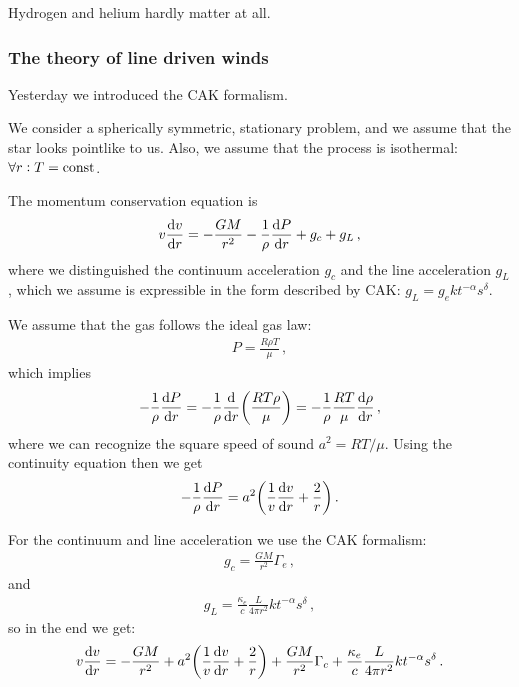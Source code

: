 \documentclass[main.tex]{subfiles}
\begin{document}
Hydrogen and helium hardly matter at all.
 
\subsubsection{The theory of line driven winds}

Yesterday we introduced the CAK formalism. 

We consider a spherically symmetric, stationary problem, and we assume that the star looks pointlike to us. 
Also, we assume that the process is isothermal: \(\forall r: T = \text{const} \). 

The momentum conservation equation is 
%
\begin{align}
v \dv{v}{r} = - \frac{GM}{r^2} - \frac{1}{\rho} \dv{P}{r} 
+ g_{c} + g_{L} 
\,,
\end{align}
%
where we distinguished the continuum acceleration \(g_{c}\) and the line acceleration \(g_{L}\), which we assume is expressible in the form described by CAK: \(g_L = g_e k t^{-\alpha } s^{ \delta } \). 

We assume that the gas follows the ideal gas law: 
%
\begin{align}
  P = \frac{R \rho T}{\mu }
\,,
\end{align}
%
which implies 
%
\begin{align}
  - \frac{1}{\rho } \dv{P}{r} = - \frac{1}{\rho }
  \dv{}{r} \qty(\frac{R T \rho }{\mu })
  = - \frac{1}{\rho } \frac{RT}{\mu } \dv{\rho }{r}
\,,
\end{align}
%
where we can recognize the square speed of sound \(a^2 = RT / \mu \). Using the continuity equation then we get 
%
\begin{align}
  - \frac{1}{\rho } \dv{P}{r} = a^2 \qty(\frac{1}{v} \dv{v}{r} + \frac{2}{r})
\,.
\end{align}

For the continuum and line acceleration we use the CAK formalism: 
%
\begin{align}
  g_{c} = \frac{GM}{r^2} \Gamma_{e}
\,,
\end{align}
%
and 
%
\begin{align}
  g_{L} = \frac{\kappa_{e}}{c} \frac{L}{4 \pi r^2} k t^{-\alpha } s^{ \delta }
\,,
\end{align}
%
so in the end we get: 
%
\begin{align}
    v \dv{v}{r} = - \frac{GM}{r^2} + a^2 \qty(\frac{1}{v} \dv{v}{r} + \frac{2}{r}) 
    + \frac{GM}{r^2} \Gamma_{c} + \frac{\kappa_{e}}{c} \frac{L}{4 \pi r^2} k t^{-\alpha } s^{ \delta }
\,.
\end{align}
\end{document}

